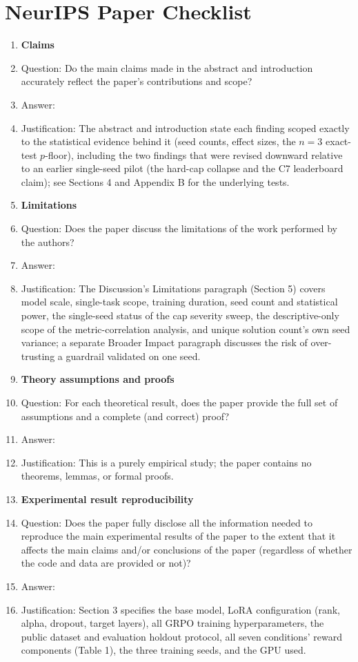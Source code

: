 \section*{NeurIPS Paper Checklist}

\begin{enumerate}

\item {\bf Claims}
    \item[] Question: Do the main claims made in the abstract and introduction accurately reflect the paper's contributions and scope?
    \item[] Answer: \answerYes{}
    \item[] Justification: The abstract and introduction state each finding scoped exactly to the statistical evidence behind it (seed counts, effect sizes, the $n=3$ exact-test $p$-floor), including the two findings that were revised downward relative to an earlier single-seed pilot (the hard-cap collapse and the C7 leaderboard claim); see Sections 4 and Appendix B for the underlying tests.

\item {\bf Limitations}
    \item[] Question: Does the paper discuss the limitations of the work performed by the authors?
    \item[] Answer: \answerYes{}
    \item[] Justification: The Discussion's Limitations paragraph (Section 5) covers model scale, single-task scope, training duration, seed count and statistical power, the single-seed status of the cap severity sweep, the descriptive-only scope of the metric-correlation analysis, and unique solution count's own seed variance; a separate Broader Impact paragraph discusses the risk of over-trusting a guardrail validated on one seed.

\item {\bf Theory assumptions and proofs}
    \item[] Question: For each theoretical result, does the paper provide the full set of assumptions and a complete (and correct) proof?
    \item[] Answer: \answerNA{}
    \item[] Justification: This is a purely empirical study; the paper contains no theorems, lemmas, or formal proofs.

\item {\bf Experimental result reproducibility}
    \item[] Question: Does the paper fully disclose all the information needed to reproduce the main experimental results of the paper to the extent that it affects the main claims and/or conclusions of the paper (regardless of whether the code and data are provided or not)?
    \item[] Answer: \answerYes{}
    \item[] Justification: Section 3 specifies the base model, LoRA configuration (rank, alpha, dropout, target layers), all GRPO training hyperparameters, the public dataset and evaluation holdout protocol, all seven conditions' reward components (Table 1), the three training seeds, and the GPU used.


\end{enumerate}
